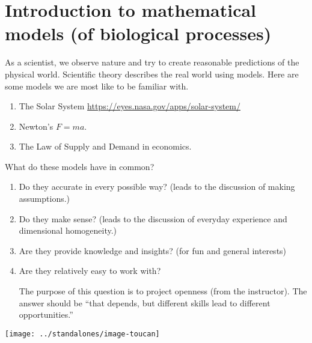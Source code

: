 \documentclass[../main.tex]{subfiles}
\begin{document}
 \section{Introduction to mathematical models (of biological processes)}

As a scientist, we observe nature and try to create reasonable predictions of the physical world. Scientific theory describes the real world using models. Here are some models we are most like to be familiar with.

\begin{enumerate}
  \item The Solar System \url{https://eyes.nasa.gov/apps/solar-system/}
  \item Newton's \(F = ma\).
  \item The Law of Supply and Demand in economics.
\end{enumerate}

\faComment{} What do these models have in common?
\begin{enumerate}
  \item Do they accurate in every possible way? (leads to the discussion of making assumptions.)
  \item Do they make sense? (leads to the discussion of everyday experience and dimensional homogeneity.)
  \item Are they provide knowledge and insights? (for fun and general interests)
  \item Are they relatively easy to work with? 

    The purpose of this question is to project openness (from the instructor). The answer should be ``that depends, but different skills lead to different opportunities.'' 
\end{enumerate}

\clearpage
\vspace{-1in}
\centerline{\texttt{[image: ../standalones/image-toucan]}}
\end{document}
